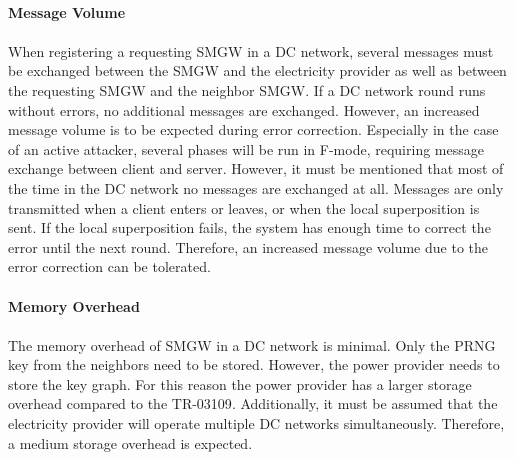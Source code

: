 \\
\textbf{Message Volume}
\\
\\
When registering a requesting \gls{SMGW} in a DC network, several messages must be exchanged between the \gls{SMGW} and the electricity provider as well as between the requesting \gls{SMGW} and the neighbor \gls{SMGW}. If a DC network round runs without errors, no additional messages are exchanged.
However, an increased message volume is to be expected during error correction. Especially in the case of an active attacker, several phases will be run in F-mode, requiring message exchange between client and server. However, it must be mentioned that most of the time in the DC network no messages are exchanged at all. Messages are only transmitted when a client enters or leaves, or when the local superposition is sent. If the local superposition fails, the system has enough time to correct the error until the next round. Therefore, an increased message volume due to the error correction can be tolerated.\\
\\
\textbf{Memory Overhead}
\\
\\
The memory overhead of \gls{SMGW} in a DC network is minimal. Only the PRNG key from the neighbors need to be stored. However, the power provider needs to store the key graph. For this reason the power provider has a larger storage overhead compared to the \gls{TR-03109}. Additionally, it must be assumed that the electricity provider will operate multiple DC networks simultaneously. Therefore, a medium storage overhead is expected.

